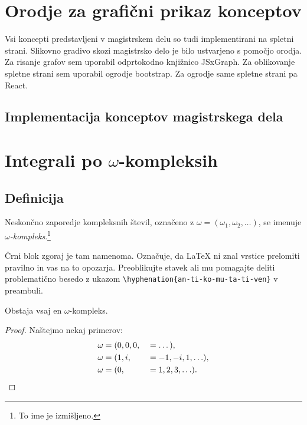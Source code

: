 \documentclass[isrm2, tisk]{fmfdelo}
\begin{document}
    \newpage


    \section{Orodje za grafični prikaz konceptov}
    Vsi koncepti predstavljeni v magistrskem delu so tudi implementirani na spletni strani.
    Slikovno gradivo skozi magistrsko delo je bilo ustvarjeno s pomočjo orodja.
    Za risanje grafov sem uporabil odprtokodno knjižnico JSxGraph.
    Za oblikovanje spletne strani sem uporabil ogrodje bootstrap.
    Za ogrodje same spletne strani pa React.

    \subsection{Implementacija konceptov magistrskega dela}


    \newpage


    \section{Integrali po \texorpdfstring{$\omega$}{ω}-kompleksih}

    \subsection{Definicija}
    \begin{definicija}
        Neskončno zaporedje kompleksnih števil, označeno z $\omega = (\omega_1, \omega_2, \ldots)$,
        se imenuje \emph{$\omega$-kompleks}.\footnote{To ime je izmišljeno.}

        Črni blok zgoraj je tam namenoma. Označuje, da \LaTeX{} ni znal vrstice prelomiti pravilno
        in vas na to opozarja. Preoblikujte stavek ali mu pomagajte deliti problematično besedo z
        ukazom \verb|\hyphenation{an-ti-ko-mu-ta-ti-ven}| v preambuli.
    \end{definicija}
    \begin{trditev}
        \label{trd:obstoj-omega}
        Obstaja vsaj en $\omega$-kompleks.
    \end{trditev}
    \begin{proof}
        Naštejmo nekaj primerov:
        \begin{align}
            \omega &= (0, 0, 0,& &= \dots), \label{eq:zero-kompleks} \\
            \omega &= (1, i, & &=-1, -i, 1, \ldots), \nonumber \\
            \omega &= (0,& &= 1, 2, 3, \ldots). \nonumber \qedhere  %
        \end{align}
    \end{proof}
\end{document}
